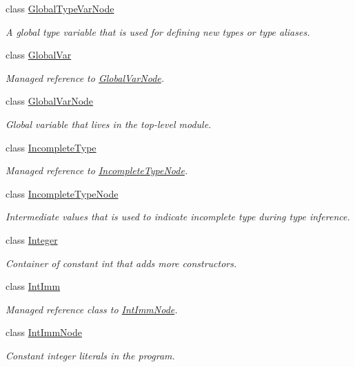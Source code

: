 \begin{DoxyCompactItemize}
class \hyperlink{classtvm_1_1GlobalTypeVarNode}{Global\+Type\+Var\+Node}
\begin{DoxyCompactList}\small\item\em A global type variable that is used for defining new types or type aliases. \end{DoxyCompactList}\item 
class \hyperlink{classtvm_1_1GlobalVar}{Global\+Var}
\begin{DoxyCompactList}\small\item\em Managed reference to \hyperlink{classtvm_1_1GlobalVarNode}{Global\+Var\+Node}. \end{DoxyCompactList}\item 
class \hyperlink{classtvm_1_1GlobalVarNode}{Global\+Var\+Node}
\begin{DoxyCompactList}\small\item\em Global variable that lives in the top-\/level module. \end{DoxyCompactList}\item 
class \hyperlink{classtvm_1_1IncompleteType}{Incomplete\+Type}
\begin{DoxyCompactList}\small\item\em Managed reference to \hyperlink{classtvm_1_1IncompleteTypeNode}{Incomplete\+Type\+Node}. \end{DoxyCompactList}\item 
class \hyperlink{classtvm_1_1IncompleteTypeNode}{Incomplete\+Type\+Node}
\begin{DoxyCompactList}\small\item\em Intermediate values that is used to indicate incomplete type during type inference. \end{DoxyCompactList}\item 
class \hyperlink{classtvm_1_1Integer}{Integer}
\begin{DoxyCompactList}\small\item\em Container of constant int that adds more constructors. \end{DoxyCompactList}\item 
class \hyperlink{classtvm_1_1IntImm}{Int\+Imm}
\begin{DoxyCompactList}\small\item\em Managed reference class to \hyperlink{classtvm_1_1IntImmNode}{Int\+Imm\+Node}. \end{DoxyCompactList}\item 
class \hyperlink{classtvm_1_1IntImmNode}{Int\+Imm\+Node}
\begin{DoxyCompactList}\small\item\em Constant integer literals in the program. \end{DoxyCompactList}\item 

\end{DoxyCompactItemize}
